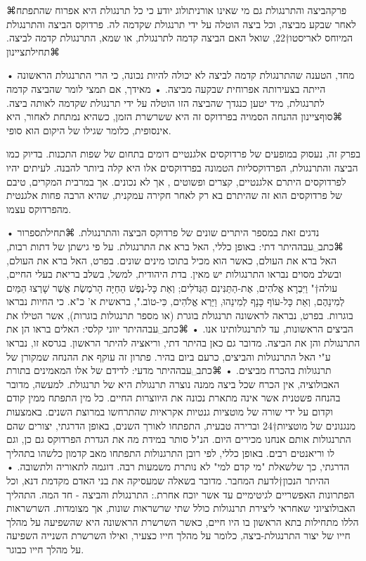  ⌘פרק{הביצה והתרנגולת}
 גם מי שאינו אורניתולוג יודע כי כל תרנגולת היא אפרוח שהתפתח לאחר שבקע מביצה, וכל  ביצה הוטלה על ידי תרנגולת שקדמה לה. פרדוקס הביצה והתרנגולת המיוחס לאריסטו†{22},
 שואל האם הביצה קדמה לתרנגולת, או שמא, התרנגולת קדמה לביצה.
⌘תחילת{ציינון}

    • מחד, הטענה שהתרנגולת קדמה לביצה לא יכולה להיות נכונה, כי הרי התרנגולת הראשונה הייתה בצעירותה אפרוחית
     שבקעה מביצה.
        • מאידך, אם תמצי לומר שהביצה קדמה לתרנגולת, מיד יטען כנגדך שהביצה הזו הוטלה על ידי תרנגולת שקדמה לאותה ביצה.
      ⌘סוף{ציינון}
        ההנחה הסמויה בפרדוקס זה היא ששרשרת הזמן, כשהיא נמתחת לאחור, היא אינסופית, כלומר שגילו של היקום הוא סופי.
        
        בפרק זה, נעסוק במופעים של פרדוקסים אלגנטיים דומים בתחום של שפות התכנות. בדיוק כמו הביצה והתרנגולת, הפרדוקסליות הטמונה בפרדוקסים אלו היא קלה ביותר להבנה. לעיתים יהיו לפרדוקסים היתרם אלגנטיים, קצרים ופשוטים , אך לא נכונים.  אך במרבית המקרים, טיבם של פרדוקסים הוא זה שהיתרם בא רק לאחר חקירה עמקנית, שהיא הרבה פחות אלגנטית מהפרדוקס עצמו.

    
    נדגים זאת במספר היתרים שונים של פרדוקס הביצה והתרנגולת.
⌘תחילת{ספרור}
        •  ⌘כתב␣עבה{היתר דתי:} באופן כללי, האל ברא את התרנגולת. על פי גישתן של דתות רבות, האל ברא את העולם, כאשר הוא מכיל בתוכו מינים שונים. בפרט, האל ברא את העולם, ובשלב מסוים נבראו התרנגולות יש מאין. בדת היהודית, למשל, בשלב בריאת בעלי החיים, עולה†{" וַיִּבְרָא אֱלֹהִים, אֶת-הַתַּנִּינִם הַגְּדֹלִים; וְאֵת כָּל-נֶפֶשׁ הַחַיָּה הָרֹמֶשֶׂת אֲשֶׁר שָׁרְצוּ הַמַּיִם לְמִינֵהֶם, וְאֵת כָּל-עוֹף כָּנָף לְמִינֵהוּ, וַיַּרְא אֱלֹהִים, כִּי-טוֹב.", בראשית א' כ"א.} כי החיות נבראו בוגרות. בפרט, נבראה לראשונה תרנגולת בוגרת (או מספר תרנגולות בוגרות), אשר הטילו את הביצים הראשונות, עד לתרנגולותינו אנו.
        • ⌘כתב␣עבה{היתר יווני קלסי:} האלים בראו הן את התרנגולת והן את הביצה. מדובר גם כאן בהיתר דתי, וריאציה להיתר הראשון. בגרסא זו, נבראו ע"י האל התרנגולות והביצים, כרעם ביום בהיר. פתרון זה עוקף את ההנחה שמקורן של תרנגולות בהכרח מביצים.
        • ⌘כתב␣עבה{היתר מדעי:} לדידם של אלו המאמינים בתורת האבולוציה, אין הכרח שכל ביצה ממנה נוצרה תרנגולת היא של תרנגולת. למעשה, מדובר בהנחה פשטנית אשר אינה מתארת נכונה את היווצרות החיים. כל מין התפתח ממין קודם וקדום על ידי שורה של מוטציות גנטיות אקראיות שהתרחשו במרוצת השנים. באמצעות מנגנונים של מוטציות†{24} וברירה טבעית, התפתחו לאורך השנים, באופן הדרגתי, יצורים שהם התרנגולות אותם אנחנו מכירים היום. הנ"ל סותר במידת מה את הגדרת הפרדוקס גם כן, וגם לו וריאנטים רבים. באופן כללי, לפי רובן התרגנולות התפתחו מאב קדמון כלשהו בתהליך הדרגתי, כך שלשאלת "מי קדם למי" לא נותרת משמעות רבה. דוגמה לתאוריה ולתשובה.
        • ההיתר הנכון†{לדעת המחבר. מדובר בשאלה שמעסיקה את בני האדם מקדמת דנא, וכל הפתרונות האפשריים לגיטימיים עד אשר יוכח אחרת.}: התרנגולת והביצה - חד המה. התהליך האבולוציוני שאחראי ליצירת תרנגולות כולל שתי שרשראות שונות, אך מצומדות. השרשראות הללו מתחילות בתא הראשון בו היו חיים, כאשר השרשרת הראשונה היא שהשפיעה על מהלך חייו של יצור התרנגולת-ביצה, כלומר על מהלך חייו כצעיר, ואילו השרשרת השנייה השפיעה על מהלך חייו כבוגר. 
        
